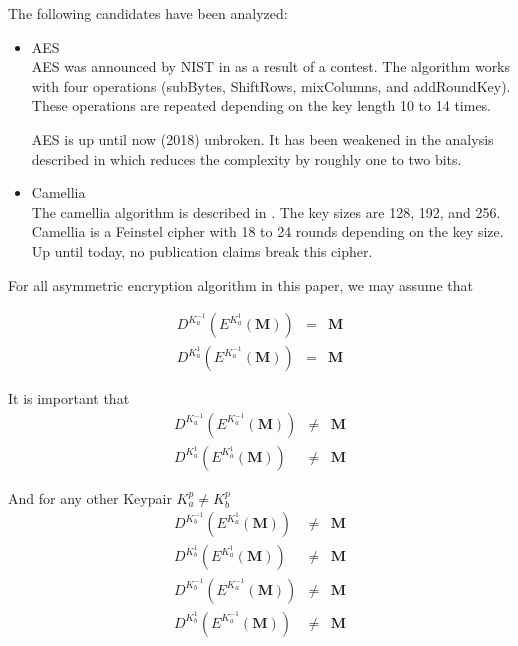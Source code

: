 The following candidates have been analyzed:
\begin{itemize}
	\item AES\\
	      AES was announced by NIST in \citeyear{standard2001announcing} as a result of a contest. The algorithm works with four operations (subBytes, ShiftRows, mixColumns, and addRoundKey). These operations are repeated depending on the key length 10 to 14 times. 
	      
	      AES is up until now (2018) unbroken. It has been weakened in the analysis described in \cite{tao2015improving} which reduces the complexity by roughly one to two bits. 
	
	\item Camellia\\
          The camellia algorithm is described in \cite{RFC3713}. The key sizes are 128, 192, and 256. Camellia is a Feinstel cipher with 18 to 24 rounds depending on the key size. Up until today, no publication claims break this cipher. 
\end{itemize}

For all asymmetric encryption algorithm in this paper, we may assume that 

\begin{eqnarray}
	D^{K^{-1}_a}\left(E^{K^{1}_a}\left(\mathbf{M}\right)\right) & = & \mathbf{M}\\
	D^{K^{1}_a}\left(E^{K^{-1}_a}\left(\mathbf{M}\right)\right) & = & \mathbf{M}
\end{eqnarray} 

It is important that 
\begin{eqnarray}
	D^{K^{-1}_a}\left(E^{K^{-1}_a}\left(\mathbf{M}\right)\right) & \neq & \mathbf{M}\\
	D^{K^{1}_a}\left(E^{K^{1}_a}\left(\mathbf{M}\right)\right)   & \neq & \mathbf{M}
\end{eqnarray} 

And for any other Keypair $K^{p}_a \neq K^{p}_b$
\begin{eqnarray}
	D^{K^{-1}_b}\left(E^{K^{1}_a}\left(\mathbf{M}\right)\right)  & \neq & \mathbf{M}\\
	D^{K^{1}_b}\left(E^{K^{1}_a}\left(\mathbf{M}\right)\right)   & \neq & \mathbf{M}\\
	D^{K^{-1}_b}\left(E^{K^{-1}_a}\left(\mathbf{M}\right)\right) & \neq & \mathbf{M}\\
	D^{K^{1}_b}\left(E^{K^{-1}_a}\left(\mathbf{M}\right)\right)  & \neq & \mathbf{M}
\end{eqnarray} 

